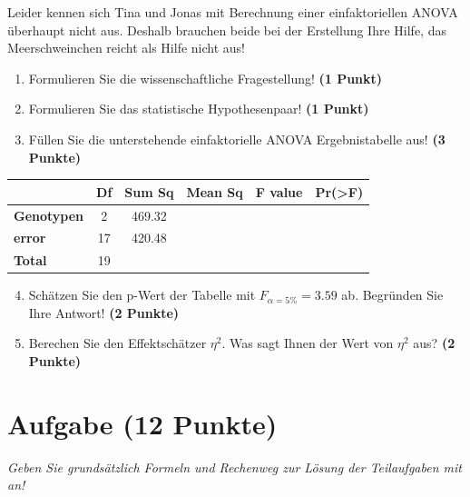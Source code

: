 \documentclass[a4paper, 9pt]{scrartcl}\usepackage[]{graphicx}\usepackage[]{xcolor}
\begin{document}
Leider kennen sich Tina und Jonas mit Berechnung einer einfaktoriellen ANOVA überhaupt nicht aus. Deshalb brauchen beide bei der Erstellung Ihre Hilfe, das Meerschweinchen reicht als Hilfe nicht aus! 

\begin{enumerate}
  \item Formulieren Sie die wissenschaftliche Fragestellung! \textbf{(1 Punkt)}
  \item Formulieren Sie das statistische Hypothesenpaar! \textbf{(1 Punkt)}
\item Füllen Sie die unterstehende einfaktorielle ANOVA Ergebnistabelle aus! \textbf{(3 Punkte)}
\end{enumerate}

\vspace{1Ex}

\begin{center}
  \Large
  \begin{tabular}{lccccp{3cm}}
\toprule
     & \textbf{Df} & \textbf{Sum Sq} & \textbf{Mean Sq} & \textbf{F value} & \textbf{Pr(>F)} \strut\\
    \midrule
   \textbf{Genotypen}  & 2 & 469.32 &  &  &  \strut\\
   \textbf{error}  & 17 & 420.48 &  &  &  \strut\\
   \textbf{Total}  & 19 &  &  &  &  \strut\\
\bottomrule
  \end{tabular}
\end{center}

\vspace{1Ex}

\begin{enumerate}
  \setcounter{enumi}{3}
\item Schätzen Sie den p-Wert der Tabelle mit $F_{\alpha = 5\%} = 3.59$ ab. Begründen Sie Ihre Antwort! \textbf{(2 Punkte)}
\item Berechen Sie den Effektschätzer $\eta^2$. Was sagt Ihnen der Wert von $\eta^2$ aus? \textbf{(2 Punkte)}
\end{enumerate}



 
\clearpage

\section{Aufgabe \hfill (12 Punkte)}

\textit{Geben Sie grundsätzlich Formeln und Rechenweg zur Lösung der Teilaufgaben mit an!} \\[1Ex]
 
\end{document}
